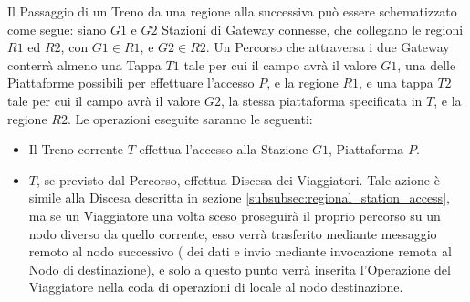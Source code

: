 	Il Passaggio di un Treno da una regione alla successiva può essere schematizzato come segue: siano $G1$ e $G2$  Stazioni di Gateway connesse, che collegano le regioni $R1$ ed $R2$, con $G1 \in R1$, e $G2 \in R2$. Un Percorso che attraversa i due Gateway conterrà almeno una Tappa $T1$ tale per cui il campo  avrà il valore $G1$,  una delle Piattaforme possibili per effettuare l'accesso $P$, e  la regione $R1$, e una tappa $T2$ tale per cui il campo  avrà il valore $G2$,  la stessa piattaforma specificata in $T$, e  la regione $R2$.
	Le operazioni eseguite saranno le seguenti:
	\begin{itemize}
		\item Il Treno corrente $T$ effettua l'accesso alla Stazione $G1$, Piattaforma $P$.
		
		\item $T$, se previsto dal Percorso, effettua Discesa dei Viaggiatori. Tale azione è simile alla Discesa descritta in sezione \ref{subsubsec:regional_station_access}, ma se un Viaggiatore una volta sceso proseguirà il proprio percorso su un nodo diverso da quello corrente, esso verrà trasferito mediante messaggio remoto al nodo successivo ( dei dati e invio mediante invocazione remota al Nodo di destinazione), e solo a questo punto verrà inserita l'Operazione  del Viaggiatore nella coda di operazioni di  locale al nodo destinazione.
		

\end{itemize}
